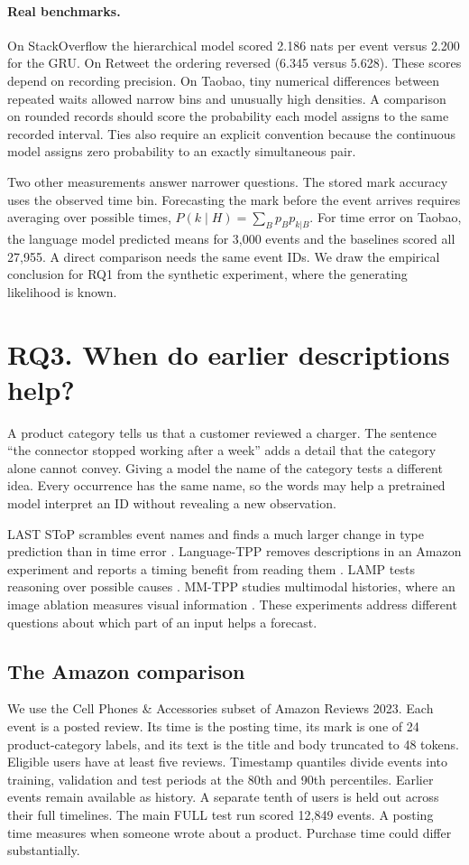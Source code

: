 \documentclass[sigconf,nonacm]{acmart}
\begin{document}
\paragraph{Real benchmarks.}
On StackOverflow the hierarchical model scored 2.186 nats per event versus 2.200 for the GRU. On Retweet the ordering reversed (6.345 versus 5.628). These scores depend on recording precision. On Taobao, tiny numerical differences between repeated waits allowed narrow bins and unusually high densities. A comparison on rounded records should score the probability each model assigns to the same recorded interval. Ties also require an explicit convention because the continuous model assigns zero probability to an exactly simultaneous pair.

Two other measurements answer narrower questions. The stored mark accuracy uses the observed time bin. Forecasting the mark before the event arrives requires averaging over possible times, $P(k\mid H)=\sum_B p_B p_{k|B}$. For time error on Taobao, the language model predicted means for 3,000 events and the baselines scored all 27,955. A direct comparison needs the same event IDs. We draw the empirical conclusion for RQ1 from the synthetic experiment, where the generating likelihood is known.

\section{RQ3. When do earlier descriptions help?}
A product category tells us that a customer reviewed a charger. The sentence ``the connector stopped working after a week'' adds a detail that the category alone cannot convey. Giving a model the name of the category tests a different idea. Every occurrence has the same name, so the words may help a pretrained model interpret an ID without revealing a new observation.

LAST SToP scrambles event names and finds a much larger change in type prediction than in time error \cite{gupta2025laststop}. Language-TPP removes descriptions in an Amazon experiment and reports a timing benefit from reading them \cite{kong2026languagetpp}. LAMP tests reasoning over possible causes \cite{shi2023lamp}. MM-TPP studies multimodal histories, where an image ablation measures visual information \cite{li2026mmtpp}. These experiments address different questions about which part of an input helps a forecast.

\subsection{The Amazon comparison}
We use the Cell Phones \& Accessories subset of Amazon Reviews 2023. Each event is a posted review. Its time is the posting time, its mark is one of 24 product-category labels, and its text is the title and body truncated to 48 tokens. Eligible users have at least five reviews. Timestamp quantiles divide events into training, validation and test periods at the 80th and 90th percentiles. Earlier events remain available as history. A separate tenth of users is held out across their full timelines. The main FULL test run scored 12,849 events. A posting time measures when someone wrote about a product. Purchase time could differ substantially.
\end{document}
